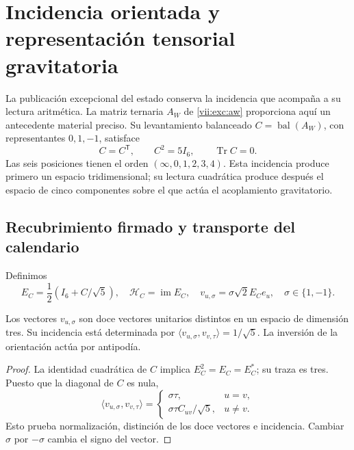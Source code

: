 \section{Incidencia orientada y representación tensorial gravitatoria}
\label{vii:vii:sec:pentacomponente}
La publicación excepcional del estado conserva la incidencia que acompaña
a su lectura aritmética. La matriz ternaria \(A_W\) de
\eqref{vii:exc:aw} proporciona aquí un antecedente material preciso. Su
levantamiento balanceado \(C=\operatorname{bal}(A_W)\), con representantes
\(0,1,-1\), satisface
\[
 C=C^{\mathsf T},\qquad C^2=5I_6,\qquad \operatorname{Tr}C=0.
\]
Las seis posiciones tienen el orden \((\infty,0,1,2,3,4)\).
Esta incidencia produce primero un espacio tridimensional; su lectura
cuadrática produce después el espacio de cinco componentes sobre el que
actúa el acoplamiento gravitatorio.

\subsection{Recubrimiento firmado y transporte del calendario}
Definimos
\[
 E_C=\frac12(I_6+C/\sqrt5),\quad
 \mathcal H_C=\operatorname{im}E_C,\quad
 v_{u,\sigma}=\sigma\sqrt2E_Ce_u,\quad \sigma\in\{1,-1\}.
\]
\begin{proposition}
\label{vii:vii:prop:doce-orientadas}
Los vectores \(v_{u,\sigma}\) son doce vectores unitarios distintos
en un espacio de dimensión tres. Su incidencia está determinada por
\(\langle v_{u,\sigma},v_{v,\tau}\rangle=1/\sqrt5\).
La inversión de la orientación actúa por antipodía.
\end{proposition}
\begin{proof}
La identidad cuadrática de \(C\) implica \(E_C^2=E_C=E_C^*\);
su traza es tres. Puesto que la diagonal de \(C\) es nula,
\[
 \langle v_{u,\sigma},v_{v,\tau}\rangle
 =\begin{cases}\sigma\tau,&u=v,\\
 \sigma\tau C_{uv}/\sqrt5,&u\ne v.
 \end{cases}
\]
Esto prueba normalización, distinción de los doce vectores e incidencia.
Cambiar \(\sigma\) por \(-\sigma\) cambia el signo del vector.
\end{proof}

